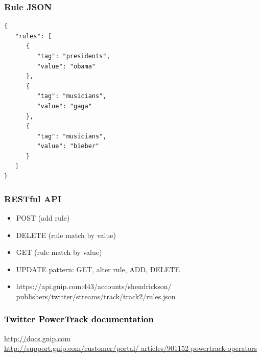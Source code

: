 \documentclass{beamer}
\begin{document}

\begin{frame}[fragile]\frametitle{Rule JSON}
\begin{verbatim}
{
   "rules": [
      {
         "tag": "presidents", 
         "value": "obama"
      }, 
      {
         "tag": "musicians", 
         "value": "gaga"
      }, 
      {
         "tag": "musicians", 
         "value": "bieber"
      }
   ]
} 
\end{verbatim}
\end{frame}

\begin{frame}\frametitle{RESTful API}
\begin{itemize}
\item POST (add rule)
\item DELETE (rule match by value)
\item GET (rule match by value)
\item UPDATE pattern: GET, alter rule, ADD, DELETE
\item https://api.gnip.com:443/accounts/shendrickson/\\
    publishers/twitter/streams/track/track2/rules.json
\end{itemize}
\end{frame}

{
\begin{frame}\frametitle{\textcolor{black} {Twitter PowerTrack documentation}}
  \begin{center}
\textcolor{black} {
\Large \href{http://docs.gnip.com/}{http://docs.gnip.com} \\ [20 pt]
\href{http://support.gnip.com/customer/portal/articles/901152-powertrack-operators}{http://support.gnip.com/customer/portal/ articles/901152-powertrack-operators} }
  \end{center}
\end{frame}
}
\end{document}
